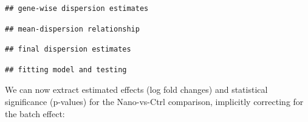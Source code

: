 \documentclass[9pt,a4paper,]{extarticle}
\newenvironment{Shaded}{\begin{snugshade}}{\end{snugshade}}
\newcommand{\KeywordTok}[1]{\textcolor[rgb]{0.13,0.29,0.53}{\textbf{{#1}}}}
\newcommand{\DataTypeTok}[1]{\textcolor[rgb]{0.13,0.29,0.53}{{#1}}}
\newcommand{\DecValTok}[1]{\textcolor[rgb]{0.00,0.00,0.81}{{#1}}}
\newcommand{\FloatTok}[1]{\textcolor[rgb]{0.00,0.00,0.81}{{#1}}}
\newcommand{\StringTok}[1]{\textcolor[rgb]{0.31,0.60,0.02}{{#1}}}
\newcommand{\CommentTok}[1]{\textcolor[rgb]{0.56,0.35,0.01}{\textit{{#1}}}}
\newcommand{\OtherTok}[1]{\textcolor[rgb]{0.56,0.35,0.01}{{#1}}}
\newcommand{\NormalTok}[1]{{#1}}
\begin{document}
\begin{verbatim}
## gene-wise dispersion estimates
\end{verbatim}

\begin{verbatim}
## mean-dispersion relationship
\end{verbatim}

\begin{verbatim}
## final dispersion estimates
\end{verbatim}

\begin{verbatim}
## fitting model and testing
\end{verbatim}

We can now extract estimated effects (log fold changes) and statistical significance (p-values) for the Nano-vs-Ctrl comparison, implicitly correcting for the batch effect:

\begin{Shaded}
\end{Shaded}
\end{document}
